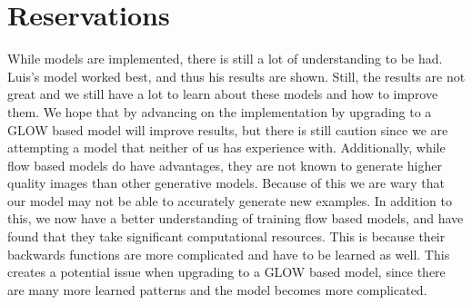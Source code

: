 \section{Reservations}
While models are implemented, there is still a lot of understanding to be had.
Luis's model worked best, and thus his results are shown. Still, the results are
not great and we still have a lot to learn about these models and how to improve
them. We hope that by advancing on the implementation by upgrading to a GLOW
based model will improve results, but there is still caution since we are
attempting a model that neither of us has experience with. Additionally, while
flow based models do have advantages, they are not known to generate higher
quality images than other generative models. Because of this we are wary that
our model may not be able to accurately generate new examples. In addition to
this, we now have a better understanding of training flow based models, and have
found that they take significant computational resources. This is because their
backwards functions are more complicated and have to be learned as well. This
creates a potential issue when upgrading to a GLOW based model, since there are
many more learned patterns and the model becomes more complicated. 

